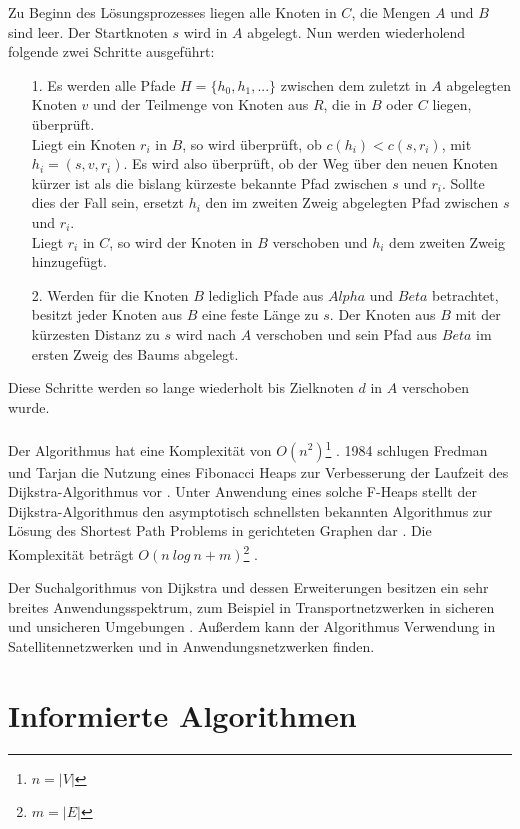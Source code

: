 Zu Beginn des Lösungsprozesses liegen alle Knoten in $C$, die Mengen $A$ und $B$ sind leer. Der Startknoten $s$ wird in $A$ abgelegt. Nun werden wiederholend folgende zwei Schritte ausgeführt:
\begin{itemize}
	\item[1.] Es werden alle Pfade $H = \{h_0, h_1, ...\}$ zwischen dem zuletzt in $A$ abgelegten Knoten $v$ und der Teilmenge von Knoten aus $R$, die in $B$ oder $C$ liegen, überprüft.\\ Liegt ein Knoten $r_i$ in $B$, so wird überprüft, ob $c(h_i) < c(s,r_i)$, mit $h_i = \left(s, v, r_i\right)$. Es wird also überprüft, ob der Weg über den neuen Knoten kürzer ist als die bislang kürzeste bekannte Pfad zwischen $s$ und $r_i$. Sollte dies der Fall sein, ersetzt $h_i$ den im zweiten Zweig abgelegten Pfad zwischen $s$ und $r_i$. \\Liegt $r_i$ in $C$, so wird der Knoten in $B$ verschoben und $h_i$ dem zweiten Zweig hinzugefügt.
	\item[2.] Werden für die Knoten $B$ lediglich Pfade aus $Alpha$ und $Beta$ betrachtet, besitzt jeder Knoten aus $B$ eine feste Länge zu $s$. Der Knoten aus $B$ mit der kürzesten Distanz zu $s$ wird nach $A$ verschoben und sein Pfad aus $Beta$ im ersten Zweig des Baums abgelegt.
\end{itemize}
Diese Schritte werden so lange wiederholt bis Zielknoten $d$ in $A$ verschoben wurde. \\ \\	
Der Algorithmus hat eine Komplexität von $O(n^2)$\footnote{$n = |V|$} \cite[S.5]{Madkour.2017}. 1984 schlugen Fredman und Tarjan die Nutzung eines Fibonacci Heaps zur Verbesserung der Laufzeit des Dijkstra-Algorithmus vor \cite{Fredman.1987}. Unter Anwendung eines solche F-Heaps stellt der Dijkstra-Algorithmus den asymptotisch schnellsten bekannten Algorithmus zur Lösung des Shortest Path Problems in gerichteten Graphen dar \cite{Schmitz.2019}.  Die Komplexität beträgt $O(n\ log\ n + m)$\footnote{$m = |E|$} \cite[S.5]{Madkour.2017}.

Der Suchalgorithmus von Dijkstra und dessen Erweiterungen besitzen ein sehr breites Anwendungsspektrum, zum Beispiel in Transportnetzwerken in sicheren \cite{BAN17} und unsicheren Umgebungen \cite{DCZM12}. Außerdem kann der Algorithmus Verwendung in Satellitennetzwerken \cite{HH15} und in Anwendungsnetzwerken \cite{JYA14} finden.

\section{Informierte Algorithmen}

